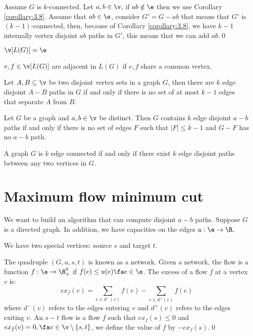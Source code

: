 \begin{prf}
    Assume $G$ is $k$-connected. Let $a, b \in \v$, if $ab \notin \e$ then we use Corollary \ref{corollary:3.8}. Assume that $ab \in \e$, consider $G' = G - ab$ that means that $G'$ is $(k - 1)$-connected, then, because of Corollary \ref{corollary:3.8}, we have $k - 1$ internally vertex disjoint $ab$ paths in $G'$, this means that we can add $ab$.\qed
\end{prf}
\begin{definition}
    $\v[L(G)] = \e$
    
    $e, f \in \v[L(G)]$ are adjacent in $L(G)$ if $e, f$ share a common vertex.
\end{definition}
\begin{customcorollary}{3.10}
\label{corollary:3.10}
    Let $A, B \subseteq \v$ be two disjoint vertex sets in a graph $G$, then there are $k$ edge disjoint $A - B$ paths in $G$ if and only if there is no set of at most $k - 1$ edges that separate $A$ from $B$.
\end{customcorollary}
\begin{customcorollary}{3.11}
\label{corollary:3.11}
    Let $G$ be a graph and $a, b \in \v$ be distinct. Then $G$ contains $k$ edge disjoint $a - b$ paths if and only if there is no set of edges $F$ such that $|F| \leq k - 1$ and $G - F$ has no $a - b$ path.
\end{customcorollary}
\begin{customcorollary}{3.12}
\label{corollary:3.12}
    A graph $G$ is $k$ edge connected if and only if there exist $k$ edge disjoint paths between any two vertices in $G$.
\end{customcorollary}
\section{Maximum flow minimum cut}
We want to build an algorithm that can compute disjoint $a - b$ paths. Suppose $G$ is a directed graph. In addition, we have capacities on the edges $u: \e \rightarrow \R$.

We have two special vertices: source $s$ and target $t$.

The quadruple $(G, u, s, t)$ is known as a network. Given a network, the flow is a function $f: \e \rightarrow \R^0_+$ if $f(e) \leq u(e) \fa e \in \e$. The excess of a flow $f$ at a vertex $v$ is:
\begin{equation*}
    ex_f(v) = \sum_{e \in d^-(v)}f(e) - \sum_{e \in d^+(v)}f(e)
\end{equation*}
where $d^-(v)$ refers to the edges entering $v$ and $d^+(v)$ refers to the edges exiting $v$. An $s - t$ flow is a flow $f$ such that $ex_f(s) \leq 0$ and $ex_f(v) = 0, \fa v \in \v \setminus \{s, t\}$, we define the value of $f$ by $- ex_f(s)$.\qed
